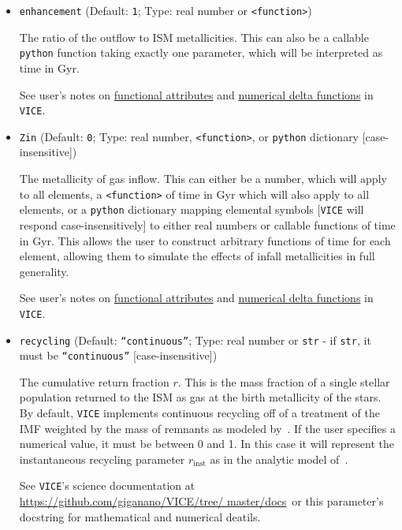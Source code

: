 \documentclass{report}
\newcommand{\docsdir}{\url{https://github.com/giganano/VICE/tree/
master/docs}}
\begin{document}
\begin{itemize}
	\item{ %
		\texttt{enhancement} (Default: \texttt{1}; Type: real number or 
		\texttt{<function>}) 
		\par
		The ratio of the outflow to ISM metallicities. This can also be a 
		callable \texttt{python} function taking exactly one parameter, which 
		will be interpreted as time in Gyr. 
		\par
		See user's notes on \hyperlink{note:pyfuncs}{functional attributes} 
		and  \hyperlink{note:delta_funcs}{numerical delta functions} in 
		\texttt{VICE}. 
	}

	\item{ %
		\texttt{Zin} (Default: \texttt{0}; Type: real number, 
		\texttt{<function>}, or \texttt{python} dictionary [case-insensitive]) 
		\par
		The metallicity of gas inflow. This can either be a number, which will 
		apply to all elements, a \texttt{<function>} of time in Gyr which will 
		also apply to all elements, or a \texttt{python} dictionary mapping 
		elemental symbols [\texttt{VICE} will respond case-insensitively] to 
		either real numbers or callable functions of time in Gyr. This allows 
		the user to construct arbitrary functions of time for each element, 
		allowing them to simulate the effects of infall metallicities in full 
		generality. 
		\par 
		See user's notes on \hyperlink{note:pyfuncs}{functional attributes} 
		and  \hyperlink{note:delta_funcs}{numerical delta functions} in 
		\texttt{VICE}. 
	}

	\item{ %
		\texttt{recycling} (Default: \texttt{``continuous''}; Type: real 
		number or \texttt{str} - if \texttt{str}, it must be 
		\texttt{``continuous''} [case-insensitive])
		\par
		The cumulative return fraction $r$. This is the mass fraction of a 
		single stellar population returned to the ISM as gas at the birth 
		metallicity of the stars. By default, \texttt{VICE} implements 
		continuous recycling off of a treatment of the IMF weighted by the 
		mass of remnants as modeled by~\citet{Kalirai2008}. If the user 
		specifies a numerical value, it must be between 0 and 1. In this case 
		it will represent the instantaneous recycling parameter 
		$r_\text{inst}$ as in the analytic model of~\citet{Weinberg2017}. 
		\par
		See \texttt{VICE}'s science documentation at \docsdir~or this 
		parameter's docstring for mathematical and numerical deatils. 
	}


\end{itemize}
\end{document}

